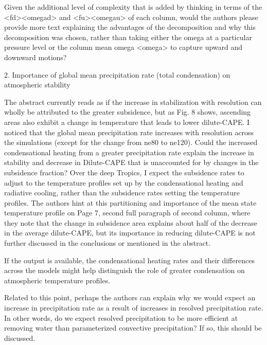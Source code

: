 \documentclass[12pt,oneside,a4paper]{article}%
\begin{document}
Given the additional level of complexity that is added by thinking in terms of the <fd><omegad> and <fu><omegau> of each column, would the authors please provide more text explaining the advantages of the decomposition and why this decomposition was chosen, rather than taking either the omega at a particular pressure level or the column mean omega <omega> to capture upward and downward motions? \newline

{\color{red}{Working on this.}} \newline

2. Importance of global mean precipitation rate (total condensation) on atmospheric stability \newline

The abstract currently reads as if the increase in stabilization with resolution can wholly be attributed to the greater subsidence, but as Fig. 8 shows, ascending areas also exhibit a change in temperature that leads to lower dilute-CAPE. I noticed that the global mean precipitation rate increases with resolution across the simulations (except for the change from ne80 to ne120). Could the increased condensational heating from a greater precipitation rate explain the increase in stability and decrease in Dilute-CAPE that is unaccounted for by changes in the subsidence fraction? Over the deep Tropics, I expect the subsidence rates to adjust to the temperature profiles set up by the condensational heating and radiative cooling, rather than the subsidence rates setting the temperature profiles. The authors hint at this partitioning and importance of the mean state temperature profile on Page 7, second full paragraph of second column, where they note that the change in subsidence area explains about half of the decrease in the average dilute-CAPE, but its importance in reducing dilute-CAPE is not further discussed in the conclusions or mentioned in the abstract. \newline

If the output is available, the condensational heating rates and their differences across the models might help distinguish the role of greater condensation on atmospheric temperature profiles. \newline

Related to this point, perhaps the authors can explain why we would expect an increase in precipitation rate as a result of increases in resolved precipitation rate. In other words, do we expect resolved precipitation to be more efficient at removing water than parameterized convective precipitation? If so, this should be discussed. \newline
\end{document}
